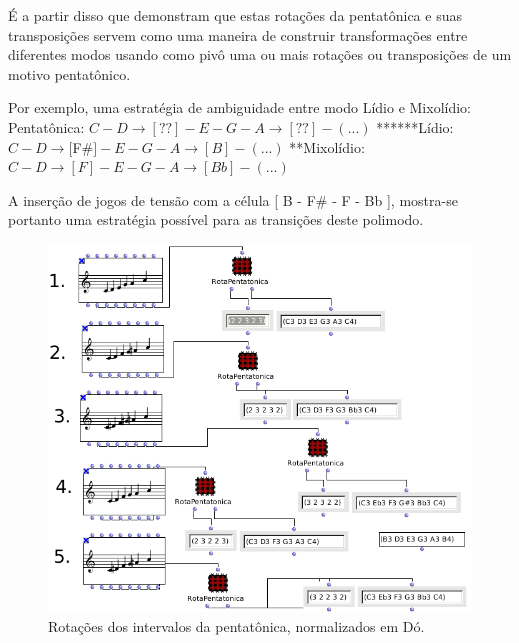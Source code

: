 \documentclass[
	12pt,				%
	openright,			%
	twoside,			%
	a4paper,			%
	english,			%
	french,				%
	spanish,			%
	brazil				%
	]{abntex2}
\begin{document}
É a partir disso que  demonstram que estas rotações da pentatônica e suas transposições servem como uma maneira de construir transformações entre diferentes modos usando como pivô uma ou mais rotações ou transposições de um motivo pentatônico. 

Por exemplo, uma estratégia de ambiguidade entre modo Lídio e Mixolídio:
\linebreak
Pentatônica: $ C - D \rightarrow [ ?? ] - E - G - A \rightarrow [ ?? ] - (...) $  \linebreak
******Lídio: $ C - D \rightarrow [ $F\#$ ] - E - G - A \rightarrow [ B ] - (...) $  \linebreak
**Mixolídio: $ C - D \rightarrow [ F ] - E - G - A \rightarrow [ Bb ] - (...) $  \linebreak

A inserção de jogos de tensão com a célula [ B - F\# - F - Bb ], mostra-se portanto uma estratégia possível para as transições deste polimodo.

\begin{figure}[!h]
	\caption{\label{fig_grafico}Rotações dos intervalos da pentatônica, normalizados em Dó. }
	\begin{center}
	    \includegraphics[scale=0.55]{OM_settheory/pentarotacoes.png}
	\end{center}
\end{figure}
\end{document}
